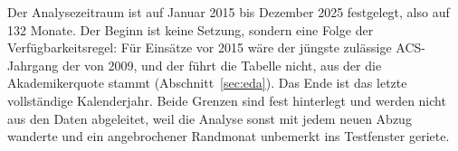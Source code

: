 \documentclass[12pt,a4paper]{article}
\begin{document}
Der Analysezeitraum ist auf Januar 2015 bis Dezember 2025 festgelegt, also auf
132 Monate. Der Beginn ist keine Setzung, sondern eine Folge der
Verfügbarkeitsregel: Für Einsätze vor 2015 wäre der jüngste zulässige
ACS-Jahrgang der von 2009, und der führt die Tabelle nicht, aus der die
Akademikerquote stammt (Abschnitt~\ref{sec:eda}). Das Ende ist das letzte
vollständige Kalenderjahr. Beide Grenzen sind fest hinterlegt und werden nicht
aus den Daten abgeleitet, weil die Analyse sonst mit jedem neuen Abzug wanderte
und ein angebrochener Randmonat unbemerkt ins Testfenster geriete.
 
\end{document}

